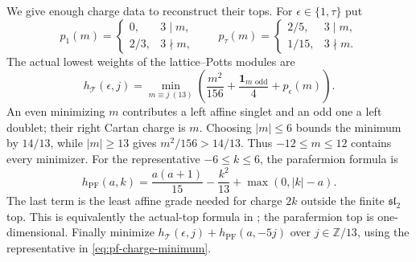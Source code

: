 We give enough charge data to reconstruct their tops. For
$\epsilon\in\{1,\tau\}$ put
\[
 p_1(m)=\begin{cases}0,&3\mid m,\\2/3,&3\nmid m,\end{cases}
 \qquad
 p_\tau(m)=\begin{cases}2/5,&3\mid m,\\1/15,&3\nmid m.\end{cases}
\]
The actual lowest weights of the lattice--Potts modules are
\begin{equation}
 h_{\mathcal T}(\epsilon,j)
 =\min_{m\equiv j\ (13)}
 \left(\frac{m^2}{156}+\frac{\mathbf1_{m\text{ odd}}}{4}
                   +p_\epsilon(m)\right).
 \label{eq:core-charge-minimum}
\end{equation}
An even minimizing $m$ contributes a left affine singlet and an odd
one a left doublet; their right Cartan charge is $m$. Choosing
$|m|\le6$ bounds the minimum by $14/13$, while $|m|\ge13$ gives
$m^2/156>14/13$. Thus $-12\le m\le12$ contains every minimizer.
For the representative $-6\le k\le6$, the parafermion formula is
\begin{equation}
 h_{\mathrm{PF}}(a,k)
 =\frac{a(a+1)}{15}-\frac{k^2}{13}+\max(0,|k|-a).
 \label{eq:pf-charge-minimum}
\end{equation}
The last term is the least affine grade needed for charge $2k$
outside the finite $\mathfrak{sl}_2$ top. This is equivalently the
actual-top formula in \cite[Section~2.4]{ALY}; the parafermion top is
one-dimensional. Finally minimize
$h_{\mathcal T}(\epsilon,j)+h_{\mathrm{PF}}(a,-5j)$ over
$j\in\mathbb Z/13$, using the representative in
\eqref{eq:pf-charge-minimum}.

